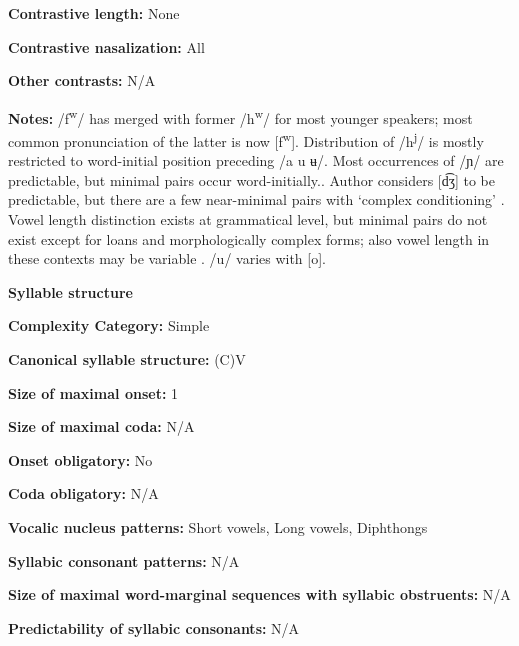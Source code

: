 \textbf{Contrastive length:} None



\textbf{Contrastive nasalization:} All



\textbf{Other contrasts:} N/A



\textbf{Notes:} /f\textsuperscript{w}/ has merged with former /h\textsuperscript{w}/ for most younger speakers; most common pronunciation of the latter is now [f\textsuperscript{w}]. Distribution of /h\textsuperscript{j}/ is mostly restricted to word-initial position preceding /a u ʉ/. Most occurrences of /ɲ/ are predictable, but minimal pairs occur word-initially.. Author considers [d͡ʒ] to be predictable, but there are a few near-minimal pairs with ‘complex conditioning’ \citep[30-49]{Olawsky2006}. Vowel length distinction exists at grammatical level, but minimal pairs do not exist except for loans and morphologically complex forms; also vowel length in these contexts may be variable \citep[56-7]{Olawsky2006}. /u/ varies with [o].



\textbf{Syllable structure}



\textbf{Complexity Category:} Simple



\textbf{Canonical syllable structure:} (C)V \citep[75-6]{Olawsky2006}



\textbf{Size of maximal onset:} 1



\textbf{Size of maximal coda:} N/A



\textbf{Onset obligatory:} No



\textbf{Coda obligatory:} N/A



\textbf{Vocalic nucleus patterns:} Short vowels, Long vowels, Diphthongs



\textbf{Syllabic consonant patterns:} N/A



\textbf{Size of maximal word{}-marginal sequences with syllabic obstruents:} N/A



\textbf{Predictability of syllabic consonants:} N/A



